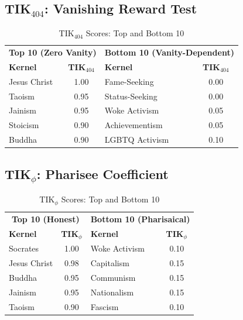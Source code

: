 \documentclass[11pt,a4paper]{article}
\theoremstyle{definition}
\theoremstyle{remark}
\begin{document}
\subsection{TIK$_{404}$: Vanishing Reward Test}

\begin{table}[H]
\centering
\caption{TIK$_{404}$ Scores: Top and Bottom 10}
\label{tab:tik404-results}
\begin{tabular}{@{}lc|lc@{}}
\toprule
\multicolumn{2}{c|}{\textbf{Top 10 (Zero Vanity)}} & \multicolumn{2}{c}{\textbf{Bottom 10 (Vanity-Dependent)}} \\
\textbf{Kernel} & \textbf{TIK$_{404}$} & \textbf{Kernel} & \textbf{TIK$_{404}$} \\
\midrule
Jesus Christ & 1.00 & Fame-Seeking & 0.00 \\
Taoism & 0.95 & Status-Seeking & 0.00 \\
Jainism & 0.95 & Woke Activism & 0.05 \\
Stoicism & 0.90 & Achievementism & 0.05 \\
Buddha & 0.90 & LGBTQ Activism & 0.10 \\
\bottomrule
\end{tabular}
\end{table}

\subsection{TIK$_\phi$: Pharisee Coefficient}

\begin{table}[H]
\centering
\caption{TIK$_\phi$ Scores: Top and Bottom 10}
\label{tab:tikpharisee-results}
\begin{tabular}{@{}lc|lc@{}}
\toprule
\multicolumn{2}{c|}{\textbf{Top 10 (Honest)}} & \multicolumn{2}{c}{\textbf{Bottom 10 (Pharisaical)}} \\
\textbf{Kernel} & \textbf{TIK$_\phi$} & \textbf{Kernel} & \textbf{TIK$_\phi$} \\
\midrule
Socrates & 1.00 & Woke Activism & 0.10 \\
Jesus Christ & 0.98 & Capitalism & 0.15 \\
Buddha & 0.95 & Communism & 0.15 \\
Jainism & 0.95 & Nationalism & 0.15 \\
Taoism & 0.90 & Fascism & 0.10 \\
\bottomrule
\end{tabular}
\end{table}
\end{document}
